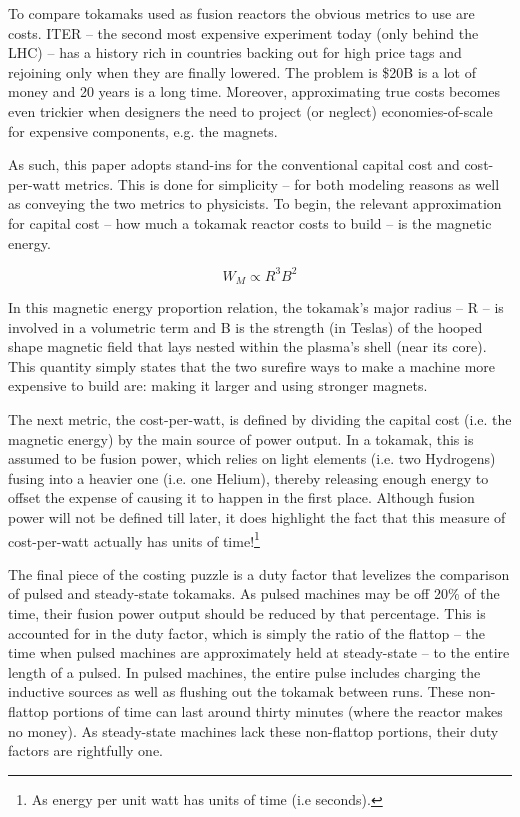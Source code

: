 To compare tokamaks used as fusion reactors the obvious metrics to use are costs. ITER -- the second most expensive experiment today (only behind the LHC) -- has a history rich in countries backing out for high price tags and rejoining only when they are finally lowered. \cite{jeff} The problem is \$20B is a lot of money and 20 years is a long time. Moreover, approximating true costs becomes even trickier when designers the need to project (or neglect)  economies-of-scale for expensive components, e.g. the magnets.

As such, this paper adopts stand-ins for the conventional capital cost and cost-per-watt metrics. This is done for simplicity -- for both modeling reasons as well as conveying the two metrics to physicists. To begin, the relevant approximation for capital cost -- how much a tokamak reactor costs to build -- is the magnetic energy. \cite{griffiths}

\begin{equation}
	W_M \propto R^3 B^2
\end{equation}

In this magnetic energy proportion relation, the tokamak's major radius -- R -- is involved in a volumetric term and B is the strength (in Teslas) of the hooped shape magnetic field that lays nested within the plasma's shell (near its core). This quantity simply states that the two surefire ways to make a machine more expensive to build are: making it larger and using stronger magnets.

The next metric, the cost-per-watt, is defined by dividing the capital cost (i.e. the magnetic energy) by the main source of power output. In a tokamak, this is assumed to be fusion power, which relies on light elements (i.e. two Hydrogens) fusing into a heavier one (i.e. one Helium), thereby releasing enough energy to offset the expense of causing it to happen in the first place. Although fusion power will not be defined till later, it does highlight the fact that this measure of cost-per-watt actually has units of time!\footnote{As energy per unit watt has units of time (i.e seconds).}

The final piece of the costing puzzle is a duty factor that levelizes the comparison of pulsed and steady-state tokamaks. As pulsed machines may be off 20\% of the time, their fusion power output should be reduced by that percentage. This is accounted for in the duty factor, which is simply the ratio of the flattop -- the time when pulsed machines are approximately held at steady-state -- to the entire length of a pulsed. In pulsed machines, the entire pulse includes charging the inductive sources as well as flushing out the tokamak between runs. These non-flattop portions of time can last around thirty minutes (where the reactor makes no money). As steady-state machines lack these non-flattop portions, their duty factors are rightfully one.


